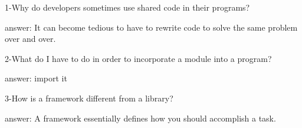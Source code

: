 1-Why do developers sometimes use shared code in their programs?


answer: It can become tedious to have to rewrite code to solve the same problem over and over.

2-What do I have to do in order to incorporate a module into a program?


answer: import it

3-How is a framework different from a library?


answer: A framework essentially defines how you should accomplish a task.


